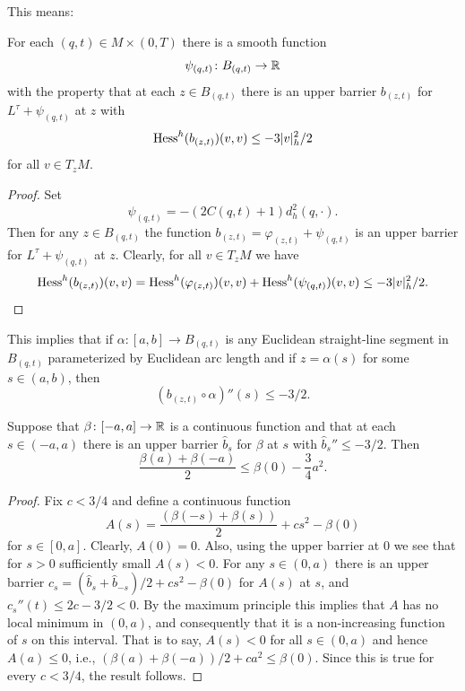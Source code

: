 This means:

\begin{claim}
\label{claim:strictly-concave-barrier}

For each $(q,t)\in M\times(0,T)$ there is a smooth function
$$\psi_{(q,t)}\colon B_{(q,t)}\to \mathbb{R}$$
 with the property that at each
$z\in B_{(q,t)}$ there is an upper barrier $b_{(z,t)}$ for
$L^\tau+\psi_{(q,t)}$ at $z$ with
$$\operatorname{Hess}^h(b_{(z,t)})(v,v)\le -3|v|_h^2/2$$
for all $v\in T_zM$.
\end{claim}

\begin{proof}\sketch
 Set
$$\psi_{(q,t)}=-(2C(q,t)+1)d^2_h(q,\cdot).$$
Then  for any $z\in B_{(q,t)}$ the function
$b_{(z,t)}=\varphi_{(z,t)}+\psi_{(q,t)}$ is an upper barrier  for
$L^\tau+\psi_{(q,t)}$ at $z$. Clearly, for all $v\in T_zM$ we have
$$\operatorname{Hess}^h(b_{(z,t)})(v,v)=\operatorname{Hess}^h(\varphi_{(z,t)})(v,v)+\operatorname{Hess}^h(\psi_{(q,t)})(v,v)\le -3|v|_h^2/2.$$
\end{proof}

This implies that if $\alpha\colon [a,b]\to B_{(q,t)}$ is any
Euclidean straight-line segment in $B_{(q,t)}$ parameterized by
Euclidean arc length and if $z= \alpha(s)$ for some $s\in (a,b)$,
then
$$(b_{(z,t)}\circ\alpha)''(s)\le -3/2.$$


\begin{claim}
\label{claim:one-dim-barrier-maximum-principle}
Suppose that $\beta\colon [-a,a]\to \mathbb{R}$ is a continuous function
and that at each $s\in (-a,a)$ there is an upper barrier $\hat b_s$
for $\beta$  at $s$ with $\hat b_s''\le -3/2$. Then
$$\frac{\beta(a)+\beta(-a)}{2}\le \beta(0)-\frac{3}{4}a^2.$$
\end{claim}

\begin{proof}\sketch
Fix $c<3/4$ and define a continuous function
$$A(s)=\frac{(\beta(-s)+\beta(s))}{2}+cs^2-\beta(0)$$ for $s\in [0,a]$.
Clearly, $A(0)=0$. Also, using the upper barrier at $0$ we see that
for $s>0$ sufficiently small $A(s)<0$. For any $s\in (0,a)$ there is
an upper barrier $c_s=(\hat b_{s}+\hat b_{-s})/2+cs^2-\beta(0)$ for
$A(s)$ at $s$, and $c_s''(t)\le 2c-3/2<0$. By the maximum principle
this implies that $A$ has no local minimum in $(0,a)$, and
consequently that it is a non-increasing function of $s$ on this
interval. That is to say, $A(s)<0$ for all $s\in (0,a)$ and hence
$A(a)\le 0$, i.e., $(\beta(a)+\beta(-a))/2+ca^2\le \beta(0)$. Since
this is true for every $c<3/4$, the result follows.
\end{proof}

